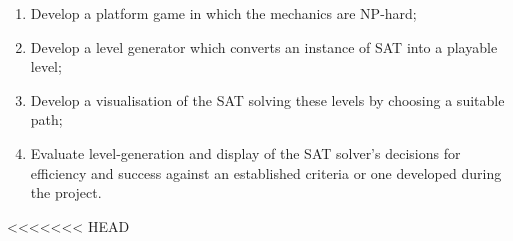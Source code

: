 \documentclass[11pt, a4paper, oneside]{report} %
\begin{document}
\begin{enumerate}

  \item Develop a platform game in which the mechanics are NP-hard;
  \item Develop a level generator which converts an instance of SAT into a playable level;
  \item Develop a visualisation of the SAT solving these levels by choosing a suitable path;
  \item Evaluate level-generation and display of the SAT solver's decisions for
        efficiency and success against an established criteria or one developed
        during the project.

\end{enumerate}


<<<<<<< HEAD






\end{document}
